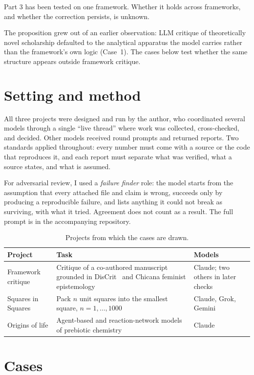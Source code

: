 \documentclass[11pt]{article}
\begin{document}
Part 3 has been tested on one framework. Whether it holds across frameworks,
and whether the correction persists, is unknown.

The proposition grew out of an earlier observation: LLM critique of
theoretically novel scholarship defaulted to the analytical apparatus the
model carries rather than the framework's own logic (Case~1). The cases
below test whether the same structure appears outside framework critique.

\section{Setting and method}

All three projects were designed and run by the author, who coordinated
several models through a single ``live thread'' where work was collected,
cross-checked, and decided. Other models received round prompts and
returned reports. Two standards applied throughout: every number must come
with a source or the code that reproduces it, and each report must separate
what was verified, what a source states, and what is assumed.

For adversarial review, I used a \emph{failure finder} role: the model
starts from the assumption that every attached file and claim is wrong,
succeeds only by producing a reproducible failure, and lists anything it
could not break as surviving, with what it tried. Agreement does not count
as a result. The full prompt is in the accompanying repository.

\begin{table}[h]
\centering
\small
\begin{tabularx}{\linewidth}{@{}lXl@{}}
\toprule
Project & Task & Models \\
\midrule
Framework critique & Critique of a co-authored manuscript grounded in
DisCrit~\cite{annamma2013} and Chicana feminist epistemology & Claude; two
others in later checks \\
Squares in Squares & Pack $n$ unit squares into the smallest square,
$n=1,\dots,1000$~\cite{kaggle,friedman} & Claude, Grok, Gemini \\
Origins of life & Agent-based and reaction-network models of prebiotic
chemistry & Claude \\
\bottomrule
\end{tabularx}
\caption{Projects from which the cases are drawn.}
\end{table}

\section{Cases}
\end{document}
